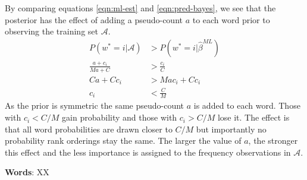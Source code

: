 \documentclass[]{article}
\newcommand{\Acal}{\mathcal{A}}
\newcommand{\betaml}{\hat{\beta}^{ML}}
\begin{document}
%
By comparing equations \ref{eqn:ml-est} and \ref{eqn:pred-bayes}, we see that the posterior has the effect of adding a pseudo-count $a$ to each word prior to observing the training set $\Acal$.
%
\begin{align*}
	P(w^*=i | \Acal) &> P(w^*=i | \betaml) \\
	\frac{a + c_i}{Ma + C} &> \frac{c_i}{C} \\
	Ca + Cc_i &> Mac_i + Cc_i \\
	c_i &< \frac{C}{M}
\end{align*}
%
As the prior is symmetric the same pseudo-count $a$ is added to each word. Those with $c_i < C/M$ gain probability and those with $c_i > C/M$ lose it. The effect is that all word probabilities are drawn closer to $C/M$ but importantly no probability rank orderings stay the same. The larger the value of $a$, the stronger this effect and the less importance is assigned to the frequency observations in $\Acal$.

\textbf{Words}: XX
\end{document}
